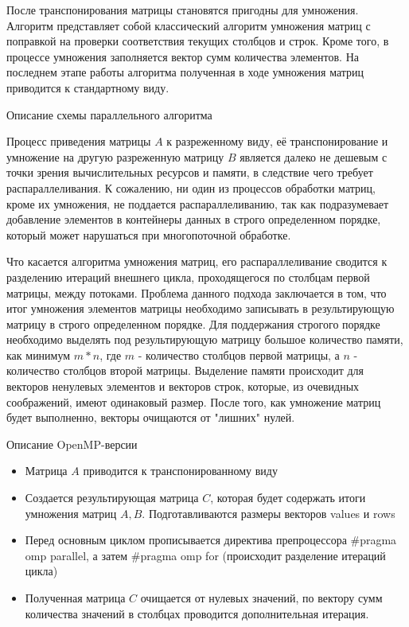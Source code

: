 \documentclass[12pt]{article}
\begin{document}
После транспонирования матрицы становятся пригодны для умножения. Алгоритм представляет собой классический алгоритм умножения матриц с поправкой на проверки соответствия текущих столбцов и строк. Кроме того, в процессе умножения заполняется вектор сумм количества элементов. На последнем этапе работы алгоритма полученная в ходе умножения матриц приводится к стандартному виду. 
\newpage
\begin{center}
\Large{Описание схемы параллельного алгоритма}
\end{center}

Процесс приведения матрицы $A$ к разреженному виду, её транспонирование и умножение на другую разреженную матрицу $B$ является далеко не дешевым с точки зрения вычислительных ресурсов и памяти, в следствие чего требует распараллеливания. К сожалению, ни один из процессов обработки матриц, кроме их умножения, не поддается распараллеливанию, так как подразумевает добавление элементов в контейнеры данных в строго определенном порядке, который может нарушаться при многопоточной обработке. 

Что касается алгоритма умножения матриц, его распараллеливание сводится к разделению итераций внешнего цикла, проходящегося по столбцам первой матрицы, между потоками. Проблема данного подхода заключается в том, что итог умножения элементов матрицы необходимо записывать в результирующую матрицу в строго определенном порядке. Для поддержания строгого порядке необходимо выделять под результирующую матрицу большое количество памяти, как минимум $m * n$, где $m$ - количество столбцов первой матрицы, а $n$ - количество столбцов второй матрицы. Выделение памяти происходит для векторов ненулевых элементов и векторов строк, которые, из очевидных соображений, имеют одинаковый размер. После того, как умножение матриц будет выполненно, векторы очищаются от "лишних" нулей.    
\newpage
\begin{center}
\Large{Описание OpenMP-версии}
\end{center}

\begin{itemize}
    \item Матрица $A$ приводится к транспонированному виду
    \item Создается результирующая матрица $C$, которая будет содержать итоги умножения матриц $A, B$. Подготавливаются размеры векторов values и rows 
    \item Перед основным циклом прописывается директива препроцессора \#pragma omp parallel, а затем \#pragma omp for (происходит разделение итераций цикла)
    \item Полученная матрица $C$ очищается от нулевых значений, по вектору сумм количества значений в столбцах проводится дополнительная итерация.
\end{itemize}
\end{document}
